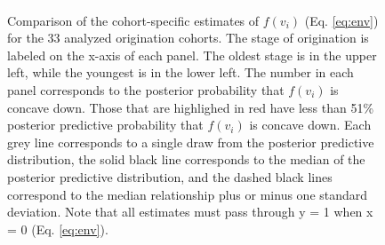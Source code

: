 \documentclass{article}
\begin{document}
\begin{figure}
  \centering
  \includegraphics[height = 0.5\textheight,width=\textwidth,keepaspectratio=true]{figure/cohort_quads}
  \caption{Comparison of the cohort-specific estimates of \(f(v_{i})\) (Eq. \ref{eq:env}) for the 33 analyzed origination cohorts. The stage of origination is labeled on the x-axis of each panel. The oldest stage is in the upper left, while the youngest is in the lower left. The number in each panel corresponds to the posterior probability that \(f(v_{i})\) is concave down. Those that are highlighed in red have less than 51\% posterior predictive probability that \(f(v_{i})\) is concave down. Each grey line corresponds to a single draw from the posterior predictive distribution, the solid black line corresponds to the median of the posterior predictive distribution, and the dashed black lines correspond to the median relationship plus or minus one standard deviation. Note that all estimates must pass through y = 1 when x = 0 (Eq. \ref{eq:env}).}
  \label{fig:env_cohort}
\end{figure}
\end{document}
